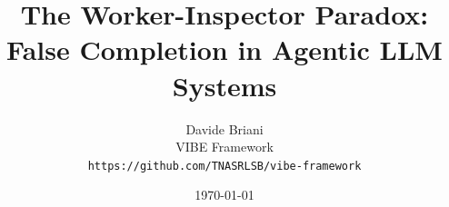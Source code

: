 \documentclass[11pt,a4paper]{article}
\title{The Worker-Inspector Paradox:\\False Completion in Agentic LLM Systems}
\author{Davide Briani\\VIBE Framework\\\texttt{https://github.com/TNASRLSB/vibe-framework}}
\date{\today}
\begin{document}
\maketitle

\begin{abstract}

\end{abstract}














\appendix




\end{document}
